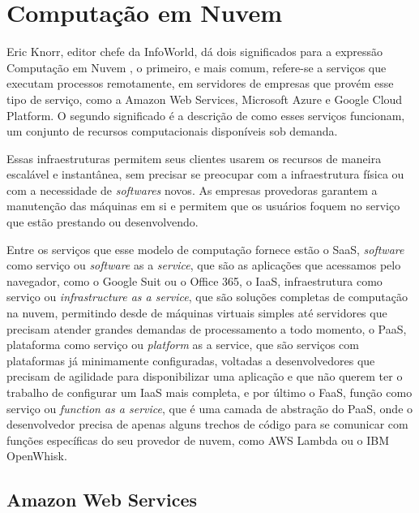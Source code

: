\section{Computação em Nuvem}

\indent
\par Eric Knorr, editor chefe da InfoWorld, dá dois significados para a expressão Computação em Nuvem \cite{CloudComp}, o primeiro, e mais comum, refere-se a serviços que executam processos remotamente, em servidores de empresas que provém esse tipo de serviço, como a Amazon Web Services, Microsoft Azure e Google Cloud Platform. O segundo significado é a descrição de como esses serviços funcionam, um conjunto de recursos computacionais disponíveis sob demanda. 
\indent
\par Essas infraestruturas permitem seus clientes usarem os recursos de maneira escalável e instantânea, sem precisar se preocupar com a infraestrutura física ou com a necessidade de \textit{softwares} novos. As empresas provedoras garantem a manutenção das máquinas em si e permitem que os usuários foquem no serviço que estão prestando ou desenvolvendo.
\indent
\par Entre os serviços que esse modelo de computação fornece estão o SaaS, \textit{software} como serviço ou \textit{software} as a \textit{service}, que são as aplicações que acessamos pelo navegador, como o Google Suit ou o Office 365, o IaaS, infraestrutura como serviço ou \textit{infrastructure as a service}, que são soluções completas de computação na nuvem, permitindo desde de máquinas virtuais simples até servidores que precisam atender grandes demandas de processamento a todo momento, o PaaS, plataforma como serviço ou \textit{platform} as a service, que são serviços com plataformas já minimamente configuradas, voltadas a desenvolvedores que precisam de agilidade para disponibilizar uma aplicação e que não querem ter o trabalho de configurar um IaaS mais completa, e por último o FaaS, função como serviço ou \textit{function as a service}, que é uma camada de abstração do PaaS, onde o desenvolvedor precisa de apenas alguns trechos de código para se comunicar com funções específicas do seu provedor de nuvem, como AWS Lambda ou o IBM OpenWhisk.

\subsection{Amazon Web Services}

